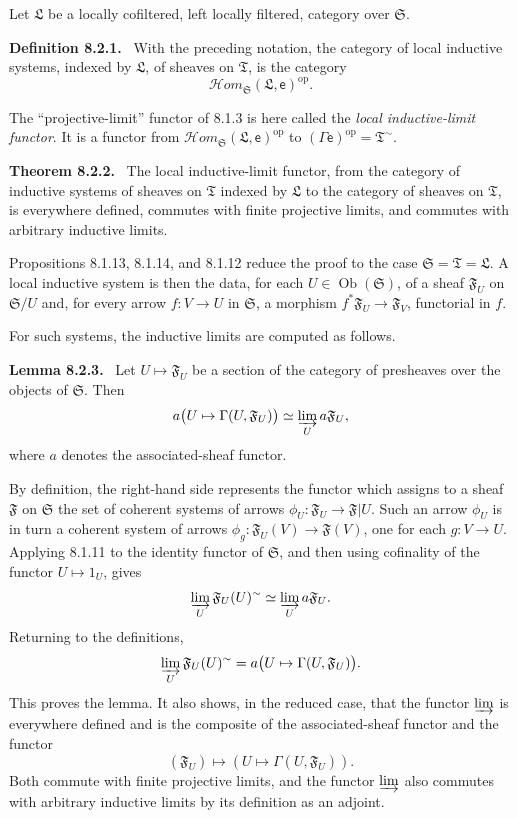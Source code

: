 \documentclass[11pt]{article}
\newcommand{\ob}{\operatorname{Ob}}
\newcommand{\Hhom}{\mathcal{H}om}
\newcommand{\op}{\mathrm{op}}
\newcommand{\Ss}{\mathfrak{S}}
\newcommand{\Tt}{\mathfrak{T}}
\newcommand{\Ll}{\mathfrak{L}}
\newcommand{\Ff}{\mathfrak{F}}
\newenvironment{statement}[1]{\par\medskip\noindent\textbf{#1.}\ }{\par\medskip}
\begin{document}
Let $\Ll$ be a locally cofiltered, left locally filtered, category over $\Ss$.

\begin{statement}{Definition 8.2.1}
With the preceding notation, the category of local inductive systems, indexed by $\Ll$, of sheaves on $\Tt$, is the category
\[
        \Hhom_{\Ss}(\Ll,\mathsf e)^{\op}.
\]
\end{statement}

The ``projective-limit'' functor of 8.1.3 is here called the \emph{local inductive-limit functor}. It is a functor from $\Hhom_{\Ss}(\Ll,\mathsf e)^{\op}$ to $(\Gamma\mathsf e)^{\op}=\Tt^{\sim}$.

\begin{statement}{Theorem 8.2.2}
The local inductive-limit functor, from the category of inductive systems of sheaves on $\Tt$ indexed by $\Ll$ to the category of sheaves on $\Tt$, is everywhere defined, commutes with finite projective limits, and commutes with arbitrary inductive limits.
\end{statement}

Propositions 8.1.13, 8.1.14, and 8.1.12 reduce the proof to the case $\Ss=\Tt=\Ll$. A local inductive system is then the data, for each $U\in\ob(\Ss)$, of a sheaf $\Ff_U$ on $\Ss/U$ and, for every arrow $f:V\to U$ in $\Ss$, a morphism $f^*\Ff_U\to\Ff_V$, functorial in $f$.

For such systems, the inductive limits are computed as follows.

\begin{statement}{Lemma 8.2.3}
Let $U\mapsto\Ff_U$ be a section of the category of presheaves over the objects of $\Ss$. Then
\[
        a\bigl(U\mapsto \Gamma(U,\Ff_U)\bigr)
        \simeq \varinjlim_U a\Ff_U,
\]
where $a$ denotes the associated-sheaf functor.
\end{statement}

By definition, the right-hand side represents the functor which assigns to a sheaf $\Ff$ on $\Ss$ the set of coherent systems of arrows $\phi_U:\Ff_U\to\Ff|U$. Such an arrow $\phi_U$ is in turn a coherent system of arrows $\phi_g:\Ff_U(V)\to\Ff(V)$, one for each $g:V\to U$. Applying 8.1.11 to the identity functor of $\Ss$, and then using cofinality of the functor $U\mapsto 1_U$, gives
\[
        \varinjlim_U \Ff_U(U)^{\sim}\simeq \varinjlim_U a\Ff_U.
\]
Returning to the definitions,
\[
        \varinjlim_U \Ff_U(U)^{\sim}=a\bigl(U\mapsto\Gamma(U,\Ff_U)\bigr).
\]
This proves the lemma. It also shows, in the reduced case, that the functor $\varinjlim$ is everywhere defined and is the composite of the associated-sheaf functor and the functor
\[
        (\Ff_U)\longmapsto (U\mapsto\Gamma(U,\Ff_U)).
\]
Both commute with finite projective limits, and the functor $\varinjlim$ also commutes with arbitrary inductive limits by its definition as an adjoint.
\end{document}
